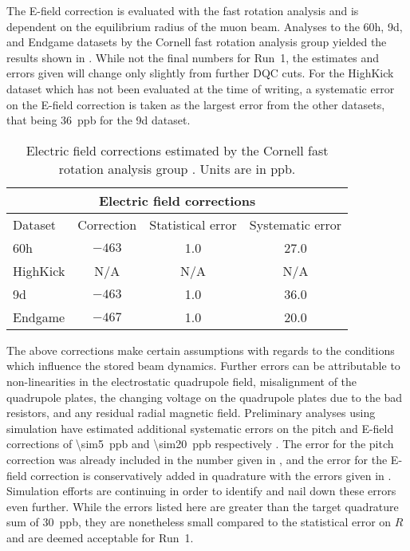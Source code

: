 

The E-field correction is evaluated with the fast rotation analysis and is dependent on the equilibrium radius of the muon beam. Analyses to the 60h, 9d, and Endgame datasets by the Cornell fast rotation analysis group yielded the results shown in . While not the final numbers for Run~1, the estimates and errors given will change only slightly from further DQC cuts. For the HighKick dataset which has not been evaluated at the time of writing, a systematic error on the E-field correction is taken as the largest error from the other datasets, that being \SI{36}{ppb} for the 9d dataset.


\begin{table}
\centering
\renewcommand{\arraystretch}{1.2}
\begin{tabular*}{\linewidth}{@{\extracolsep{\fill}}lccc}
  \hline
    \multicolumn{4}{c}{\textbf{Electric field corrections}} \\
  \hline\hline
    Dataset & Correction & Statistical error & Systematic error \\
  \hline
    60h & $-463$ & 1.0 & 27.0 \\
    HighKick & N/A & N/A & N/A \\
    9d & $-463$ & 1.0 & 36.0 \\
    Endgame & $-467$ & 1.0 & 20.0 \\
  \hline
\end{tabular*}
\caption[Electric field corrections estimated by the Cornell fast rotation analysis group]{Electric field corrections estimated by the Cornell fast rotation analysis group \cite{AntoineEField60h,AntoineEField9d,AntoineEFieldEndgame}. Units are in ppb.}
\label{tab:EfieldCorrections}
\end{table}



The above corrections make certain assumptions with regards to the conditions which influence the stored beam dynamics. Further errors can be attributable to non-linearities in the electrostatic quadrupole field, misalignment of the quadrupole plates, the changing voltage on the quadrupole plates due to the bad resistors, and any residual radial magnetic field. Preliminary analyses using simulation have estimated additional systematic errors on the pitch and E-field corrections of \SI{\sim5}{ppb} and \SI{\sim20}{ppb} respectively \cite{DaveRubinElbaBadResistors,DaveRubinBadResistorsUpdate}. The error for the pitch correction was already included in the number given in , and the error for the E-field correction is conservatively added in quadrature with the errors given in . Simulation efforts are continuing in order to identify and nail down these errors even further. While the errors listed here are greater than the target quadrature sum of \SI{30}{ppb}, they are nonetheless small compared to the statistical error on $R$ and are deemed acceptable for Run~1.


